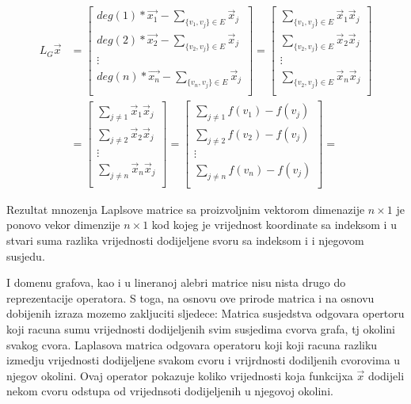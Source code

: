 \documentclass[11pt]{article}
\begin{document}
	\[
		\begin{split}
		L_G \vec{x} & =
		\begin{bmatrix}
				deg(1) * \vec{x_1} - \sum_{\{v_1,v_j\} \in E} \vec{x}_j \\
			deg(2) * \vec{x_2} - \sum_{\{v_2,v_j\} \in E} \vec{x}_j \\
			\vdots \\
			deg(n) * \vec{x_n} - \sum_{\{v_n,v_j\} \in E} \vec{x}_j \\
		\end{bmatrix} =
		\begin{bmatrix}
			\sum_{\{v_1,v_j\} \in E} \vec{x}_1\vec{x}_j \\
			\sum_{\{v_2,v_j\} \in E} \vec{x}_2\vec{x}_j \\
			\vdots \\
			\sum_{\{v_2,v_j\} \in E} \vec{x}_n\vec{x}_j \\
		\end{bmatrix} \\
		& = 
		\begin{bmatrix}
			\sum_{ j \neq 1}  \vec{x}_1\vec{x}_j \\
			\sum_{ j \neq 2}  \vec{x}_2\vec{x}_j \\
			\vdots \\
			\sum_{ j \neq n}  \vec{x}_n\vec{x}_j \\
		\end{bmatrix} =
		\begin{bmatrix}
			\sum_{ j \neq 1}  f(v_1) - f(v_j) \\
			\sum_{ j \neq 2}  f(v_2) - f(v_j) \\
			\vdots \\
			\sum_{ j \neq n}  f(v_n) - f(v_j) \\
		\end{bmatrix} =
		\end{split}
	\]

	Rezultat mnozenja Laplsove matrice sa proizvoljnim vektorom dimenazije $n \times 1$ je ponovo vekor dimenzije $n \times 1$
	kod kojeg je vrijednost koordinate sa indeksom i u stvari suma razlika vrijednosti dodijeljene svoru sa indeksom i i njegovom susjedu.

	I domenu grafova, kao i u lineranoj alebri matrice nisu nista drugo do reprezentacije operatora. S toga, na osnovu ove prirode matrica i 
	na osnovu dobijenih izraza mozemo zakljuciti sljedece:
	Matrica susjedstva odgovara opertoru koji racuna sumu vrijednosti dodijeljenih svim susjedima cvorva grafa, tj okolini svakog cvora.
	Laplasova matrica odgovara operatoru koji koji racuna razliku izmedju vrijednosti dodijeljene svakom cvoru i vrijrdnosti dodiljenih
	cvorovima u njegov okolini. Ovaj operator pokazuje koliko vrijednosti koja funkcijxa $\vec{x}$ dodijeli nekom cvoru odstupa od vrijednsoti
	dodijeljenih u njegovoj okolini.
\end{document}
